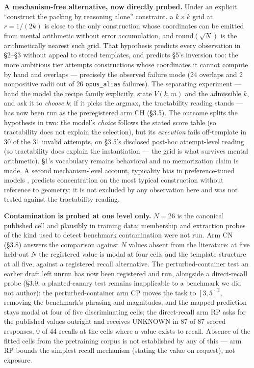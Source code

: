 \textbf{A mechanism-free alternative, now directly probed.} Under an explicit ``construct the packing by
reasoning alone'' constraint, a $k \times k$ grid at $r = 1/(2k)$ is close to the only construction whose
coordinates can be emitted from mental arithmetic without error accumulation, and $\mathrm{round}(\sqrt{N})$ is
the arithmetically nearest such grid. That hypothesis predicts every observation in \S2--\S3
without appeal to stored templates, and predicts \S5's inversion too: the more ambitious tier
attempts constructions whose coordinates it cannot compute by hand and overlaps --- precisely the
observed failure mode (24 overlaps and 2 nonpositive radii out of 26 \texttt{opus\_alias} failures). The
separating experiment --- hand the model the recipe family explicitly, state $V(k, m)$ and the
admissible $k$, and ask it to \emph{choose} $k$; if it picks the argmax, the tractability reading stands
--- has now been run as the preregistered arm CH (\S3.5). The outcome splits the hypothesis in
two: the model's \emph{choice} follows the stated score table (so tractability does not explain
the selection), but its \emph{execution} fails off-template in 30 of the 31 invalid attempts, on \S3.5's
disclosed post-hoc attempt-level reading (so
tractability does explain the instantiation --- the grid is what survives mental arithmetic).
\S1's vocabulary remains behavioral and no memorization claim is made. A second mechanism-level account, typicality bias in preference-tuned models \citep{zhang2026verbalizedsamplingmitigatemode}, predicts concentration on the most typical construction without reference to geometry; it is not excluded by any observation here and was not tested against the tractability reading.

\textbf{Contamination is probed at one level only.} $N = 26$ is the canonical published cell and
plausibly in training data; membership and extraction probes of the kind used to detect benchmark contamination \citep{carlini2021extracting,golchin2024timetravel} were not run. Arm CN (\S3.8) answers the comparison against $N$ values absent from
the literature: at five held-out $N$ the registered value is modal at four cells and the
template structure at all five, against a registered recall alternative. The perturbed-container
test an earlier draft left unrun has now been registered and run, alongside a direct-recall
probe (\S3.9; a planted-canary test remains inapplicable to a benchmark we did not author): the perturbed-container
arm CP moves the task to $[3,5]^2$, removing the benchmark's phrasing and magnitudes, and the mapped
prediction stays modal at four of five discriminating cells; the direct-recall arm RP asks
for the published values outright and receives UNKNOWN in 87 of 87 scored responses, 0 of 44
recalls at the cells where a value exists to recall. Absence of the fitted cells from
the pretraining corpus is not established by any of this --- arm RP bounds the simplest
recall mechanism (stating the value on request), not exposure.

